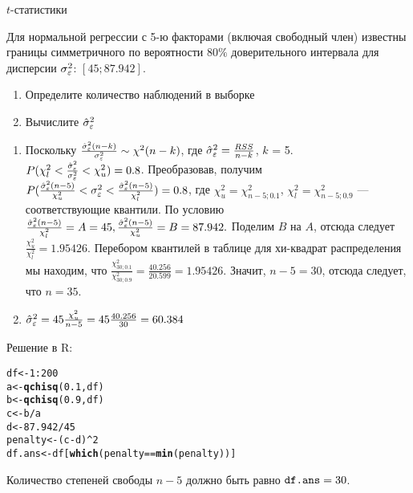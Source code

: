 \documentclass[pdftex,11pt,openany]{book}\usepackage[]{graphicx}\usepackage[]{color}
\makeatletter
\newcommand{\hlnum}[1]{\textcolor[rgb]{0.686,0.059,0.569}{#1}}%
\newcommand{\hlopt}[1]{\textcolor[rgb]{0,0,0}{#1}}%
\newcommand{\hlstd}[1]{\textcolor[rgb]{0.345,0.345,0.345}{#1}}%
\newcommand{\hlkwb}[1]{\textcolor[rgb]{0.69,0.353,0.396}{#1}}%
\newcommand{\hlkwd}[1]{\textcolor[rgb]{0.737,0.353,0.396}{\textbf{#1}}}%
\newenvironment{kframe}{%
 \def\at@end@of@kframe{}%
 \ifinner\ifhmode%
  \def\at@end@of@kframe{\end{minipage}}%
  \begin{minipage}{\columnwidth}%
 \fi\fi%
 \def\FrameCommand##1{\hskip\@totalleftmargin \hskip-\fboxsep
 \colorbox{shadecolor}{##1}\hskip-\fboxsep
     \hskip-\linewidth \hskip-\@totalleftmargin \hskip\columnwidth}%
 \MakeFramed {\advance\hsize-\width
   \@totalleftmargin\z@ \linewidth\hsize
   \@setminipage}}%
 {\par\unskip\endMakeFramed%
 \at@end@of@kframe}
\newenvironment{knitrout}{}{} %
\makeatother
\begin{document}
\begin{solution}
$t$-статистики
\end{solution}

\begin{problem}
 Для нормальной регрессии с 5-ю факторами (включая свободный член) известны границы симметричного по вероятности 80$\%$ доверительного интервала для дисперсии $\sigma_{\varepsilon}^2$: $[45; 87.942]$.

\begin{enumerate}
\item Определите количество наблюдений в выборке
\item Вычислите $\hat{\sigma}_{\varepsilon}^2$
\end{enumerate}
\end{problem}
 
\begin{solution}
\begin{enumerate}
\item Поскольку $\frac{\hat{\sigma}_{\varepsilon}^2(n-k)}{\sigma_{\varepsilon}^2} \sim \chi ^2(n-k)$, где $\hat{\sigma}_{\varepsilon}^2 = \frac{RSS}{n-k}$, $k$ = 5. $P(\chi_{l}^2 < \frac{\hat{\sigma}_{\varepsilon}^2}{\sigma_{\varepsilon}^2} < \chi_{u}^2) = 0.8$. Преобразовав, получим $P(\frac{\hat{\sigma}_{\varepsilon}^2(n-5)}{\chi_{u}^2} < \sigma_{\varepsilon}^2 < \frac{\hat{\sigma}_{\varepsilon}^2(n-5)}{\chi_{l}^2}) = 0.8$, где $\chi_{u}^2 = \chi_{n-5; 0.1} ^2$, $\chi_{l}^2 = \chi_{n-5; 0.9} ^2$ --- соответствующие квантили. По условию $\frac{\hat{\sigma}_{\varepsilon}^2(n-5)}{\chi_{l}^2} = A = 45, \frac{\hat{\sigma}_{\varepsilon}^2(n-5)}{\chi_{u}^2} = B = 87.942.$ Поделим $B$ на $A$, отсюда следует $\frac{\chi_{u}^2}{\chi_{l}^2} = 1.95426.$ Перебором квантилей в таблице для хи-квадрат распределения мы находим, что $\frac{\chi_{30; 0.1}^2}{\chi_{30; 0.9}^2} = \frac{40.256}{20.599} = 1.95426.$ Значит, $n - 5 = 30$, отсюда следует, что $n = 35.$
\item $\hat{\sigma}_{\varepsilon}^2 = 45 \frac{\chi_{u}^2}{n-5} = 45 \frac{40.256}{30} = 60.384$ 
\end{enumerate}

Решение в R:
\begin{knitrout}
\color{fgcolor}\begin{kframe}
\begin{alltt}
\hlstd{df} \hlkwb{<-} \hlnum{1}\hlopt{:}\hlnum{200}
\hlstd{a} \hlkwb{<-} \hlkwd{qchisq}\hlstd{(}\hlnum{0.1}\hlstd{,df)}
\hlstd{b} \hlkwb{<-} \hlkwd{qchisq}\hlstd{(}\hlnum{0.9}\hlstd{,df)}
\hlstd{c} \hlkwb{<-} \hlstd{b}\hlopt{/}\hlstd{a}
\hlstd{d} \hlkwb{<-} \hlnum{87.942}\hlopt{/}\hlnum{45}
\hlstd{penalty} \hlkwb{<-} \hlstd{(c}\hlopt{-}\hlstd{d)}\hlopt{^}\hlnum{2}
\hlstd{df.ans} \hlkwb{<-} \hlstd{df[}\hlkwd{which}\hlstd{(penalty}\hlopt{==}\hlkwd{min}\hlstd{(penalty))]}
\end{alltt}
\end{kframe}
\end{knitrout}
Количество степеней свободы $n-5$ должно быть равно $\verb|df.ans|=30$.

\end{solution}
\end{document}

